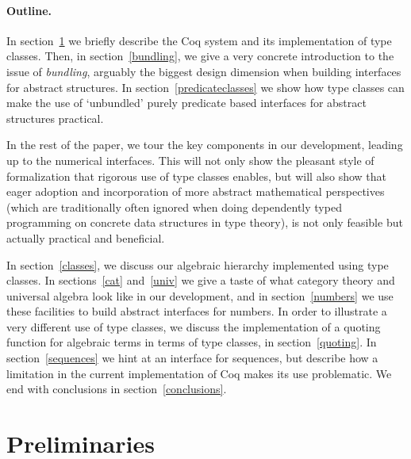 \documentclass[a4paper,10pt,runningheads]{llncs}
\begin{document}
\paragraph{Outline.}
In section~\ref{preliminaries} we briefly describe the Coq system and its implementation of type classes. Then, in section~\ref{bundling}, we give a very concrete introduction to the issue of \emph{bundling}, arguably the biggest design dimension when building interfaces for abstract structures. In section~\ref{predicateclasses} we show how type classes can make the use of `unbundled' purely predicate based interfaces for abstract structures practical.

In the rest of the paper, we tour the key components in our development, leading up to the numerical interfaces. This will not only show the pleasant style of formalization that rigorous use of type classes enables, but will also show that eager adoption and incorporation of more abstract mathematical perspectives (which are traditionally often ignored when doing dependently typed programming on concrete data structures in type theory), is not only feasible but actually practical and beneficial.

 In section~\ref{classes}, we discuss our algebraic hierarchy implemented using type classes. In sections~\ref{cat} and~\ref{univ} we give a taste of what category theory and universal algebra look like in our development, and in section~\ref{numbers} we use these facilities to build abstract interfaces for numbers. In order to illustrate a very different use of type classes, we discuss the implementation of a quoting function for algebraic terms in terms of type classes, in section~\ref{quoting}. In section~\ref{sequences} we hint at an interface for sequences, but describe how a limitation in the current implementation of Coq makes its use problematic. We end with conclusions in section~\ref{conclusions}.



\section{Preliminaries}
\label{preliminaries}
\end{document}
